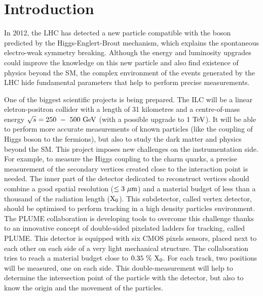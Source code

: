 \chapter{Introduction}

  In 2012, the \gls{LHC} has detected a new particle compatible with the boson predicted by the Higgs-Englert-Brout mechanism, which explains the spontaneous electro-weak symmetry breaking.
  Although the energy and luminosity upgrades could improve the knowledge on this new particle and also find existence of physics beyond the \gls{SM}, the complex environment of the events generated by the \gls{LHC} hide fundamental parameters that help to perform precise measurements.

  One of the biggest scientific projects is being prepared. 
  The \gls{ILC} will be a linear eletron-positron collider with a length of 31 kilometres and a centre-of-mass energy  $\sqrt{s} = 250~-~500~\rm{GeV}$ (with a possible upgrade to $1~\rm{TeV}$). 
  It will be able to perform more accurate measurements of known particles (like the coupling of Higgs boson to the fermions), but also to study the dark matter and physics beyond the \gls{SM}. 
  This project imposes new challenges on the instrumentation side. 
  For example, to measure the Higgs coupling to the charm quarks, a precise measurement of the secondary vertices created close to the interaction point is needed.
  The inner part of the detector dedicated to reconstruct vertices should combine a good spatial resolution ($\leq 3~\rm{\mu m}$) and a material budget of less than a thousand of the radiation length ($\rm{X_0}$).
  This subdetector, called vertex detector, should be optimised to perform tracking in a high density particles environment.
  The \gls{PLUME} collaboration is developing tools to overcome this challenge thanks to an innovative concept of double-sided pixelated ladders for tracking, called \gls{PLUME}. 
  This detector is equipped with six \gls{CMOS} pixels sensors, placed next to each other on each side of a very light mechanical structure. 
  The collaboration tries to reach a material budget close to $0.35~\%~\rm{X_0}$. 
  For each track, two positions will be measured, one on each side. 
  This double-measurement will help to determine the intersection point of the particle with the detector, but also to know the origin and the movement of the particles.


